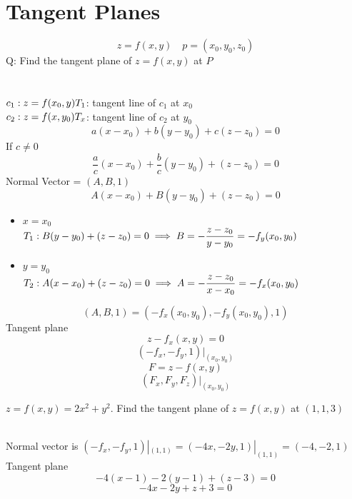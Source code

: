 \section{Tangent Planes}
\begin{notn}
\[z = f(x, y) \quad p = (x_0, y_0, z_0)\]
Q: Find the tangent plane of \(z = f(x, y)\) at \(P\)\\\\\\
\(c_1: z = f(x_0, y)\\
T_1\): tangent line of \(c_1\) at \(x_0\)\\
\(c_2: z = f(x, y_0)\\
T_x\): tangent line of \(c_2\) at \(y_0\)\\
\[a(x - x_0) + b(y - y_0) + c(z - z_0) = 0\]
If \(c \neq 0\)
\[\displaystyle \frac{a}{c} (x - x_0) + \frac{b}{c} (y - y_0) + (z - z_0) = 0\]
Normal Vector = \((A, B, 1)\)\\
\[A(x - x_0) + B(y - y_0) + (z - z_0) = 0\]
\begin{itemize}
\item \(x = x_0\)\\
\(T_1: B(y - y_0) + (z - z_0) = 0\\
\implies \displaystyle B = - \frac{z - z_0}{y - y_0} = - f_y(x_0, y_0)\)
\item \(y = y_0\)\\
\(T_2: A(x - x_0) + (z - z_0) = 0\\
\implies \displaystyle A = - \frac{z - z_0}{x - x_0} = - f_x(x_0, y_0)\)
\end{itemize}
\[(A, B, 1) = ( -f_x(x_0, y_0), -f_y(x_0, y_0), 1)\]
Tangent plane\\
\[z - f_x(x, y) = 0\]
\[\displaystyle (-f_x, -f_y, 1)|_{(x_0, y_0)}\]
\[F = z - f(x, y)\]
\[\displaystyle (F_x, F_y, F_z)|_{(x_0, y_0)}\]
\end{notn}
\begin{eg}
\(z = f(x, y) = 2x^2 + y^2\). Find the tangent plane of \(z = f(x, y)\) at \((1, 1, 3)\)

\soln \ \\
Normal vector is \((- f_x, -f_y, 1)|_{(1, 1)} = (-4x, -2y, 1)|_{(1, 1)} = (-4, -2, 1)\)\\
Tangent plane
\[-4(x - 1) - 2(y - 1) + (z - 3) = 0\]
\[-4x - 2y + z + 3 = 0\]
\end{eg}
